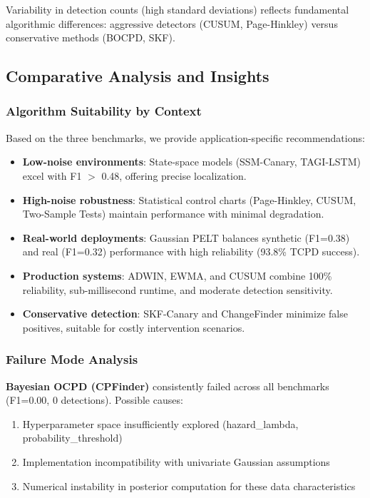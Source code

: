 Variability in detection counts (high standard deviations) reflects fundamental algorithmic differences: aggressive detectors (CUSUM, Page-Hinkley) versus conservative methods (BOCPD, SKF).

\subsection{Comparative Analysis and Insights}

\subsubsection{Algorithm Suitability by Context}

Based on the three benchmarks, we provide application-specific recommendations:

\begin{itemize}
    \item \textbf{Low-noise environments}: State-space models (SSM-Canary, TAGI-LSTM) excel with F1 $>$ 0.48, offering precise localization.
    \item \textbf{High-noise robustness}: Statistical control charts (Page-Hinkley, CUSUM, Two-Sample Tests) maintain performance with minimal degradation.
    \item \textbf{Real-world deployments}: Gaussian PELT balances synthetic (F1=0.38) and real (F1=0.32) performance with high reliability (93.8\% TCPD success).
    \item \textbf{Production systems}: ADWIN, EWMA, and CUSUM combine 100\% reliability, sub-millisecond runtime, and moderate detection sensitivity.
    \item \textbf{Conservative detection}: SKF-Canary and ChangeFinder minimize false positives, suitable for costly intervention scenarios.
\end{itemize}

\subsubsection{Failure Mode Analysis}

\textbf{Bayesian OCPD (CPFinder)} consistently failed across all benchmarks (F1=0.00, 0 detections). Possible causes:
\begin{enumerate}
    \item Hyperparameter space insufficiently explored (hazard\_lambda, probability\_threshold)
    \item Implementation incompatibility with univariate Gaussian assumptions
    \item Numerical instability in posterior computation for these data characteristics
\end{enumerate}

